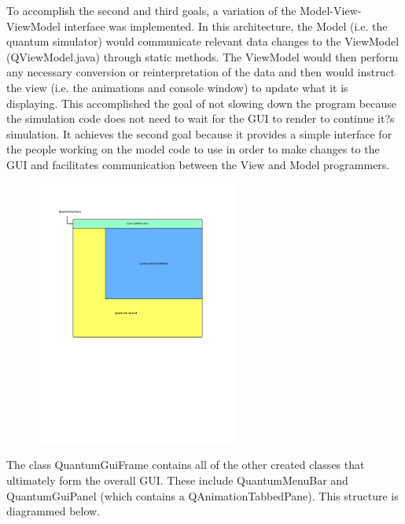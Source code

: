 \documentclass[bibliography=totocnumbered, 10pt]{article}
\theoremstyle{NoticeStyle}
\begin{document}
To accomplish the second and third goals, a variation of the Model-View-ViewModel interface was implemented.  In this architecture, the Model (i.e. the quantum simulator) would communicate relevant data changes to the ViewModel (QViewModel.java) through static methods. The ViewModel would then perform any necessary conversion or reinterpretation of the data and then would instruct the view (i.e. the animations and console window) to update what it is displaying. This accomplished the goal of not slowing down the program because the simulation code does not need to wait for the GUI to render to continue it?s simulation. It achieves the second goal because it provides a simple interface for the people working on the model code to use in order to make changes to the GUI and facilitates communication between the View and Model programmers.

\begin{figure}[H]
\centering
\includegraphics[width=0.6\textwidth]{img/GuiDiagram.pdf}
\caption{}
\end{figure}

The class QuantumGuiFrame contains all of the other created classes that ultimately form the overall GUI. These include QuantumMenuBar and QuantumGuiPanel (which contains a QAnimationTabbedPane). This structure is diagrammed below.
\end{document}
